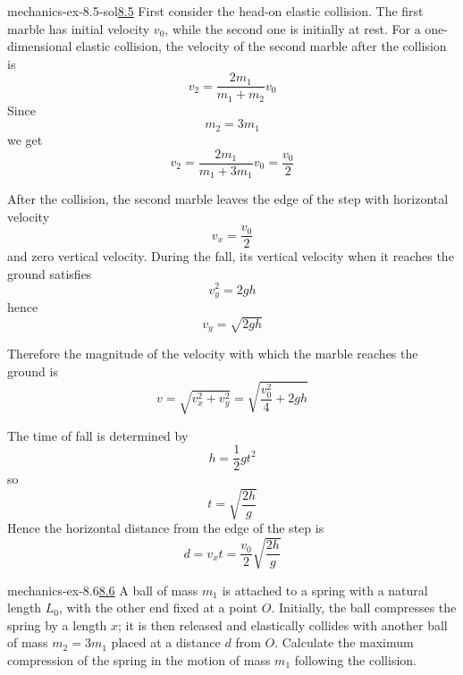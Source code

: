 \documentclass[preview]{standalone}
\begin{document}
\begin{snippetsolution}{mechanics-ex-8.5-sol}{\underline{8.5}}
    First consider the head-on elastic collision. The first marble has initial
    velocity \(v_0\), while the second one is initially at rest. For a one-dimensional
    elastic collision, the velocity of the second marble after the collision is
    \[
        v_2
        =
        \frac{2m_1}{m_1+m_2}v_0
    \]
    Since
    \[
        m_2 = 3m_1
    \]
    we get
    \[
        v_2
        =
        \frac{2m_1}{m_1+3m_1}v_0
        =
        \frac{v_0}{2}
    \]

    After the collision, the second marble leaves the edge of the step with
    horizontal velocity
    \[
        v_x = \frac{v_0}{2}
    \]
    and zero vertical velocity. During the fall, its vertical velocity when it
    reaches the ground satisfies
    \[
        v_y^2 = 2gh
    \]
    hence
    \[
        v_y = \sqrt{2gh}
    \]

    Therefore the magnitude of the velocity with which the marble reaches the
    ground is
    \[
        v
        =
        \sqrt{v_x^2+v_y^2}
        =
        \sqrt{\frac{v_0^2}{4}+2gh}
    \]

    The time of fall is determined by
    \[
        h = \frac{1}{2}gt^2
    \]
    so
    \[
        t = \sqrt{\frac{2h}{g}}
    \]
    Hence the horizontal distance from the edge of the step is
    \[
        d
        =
        v_x t
        =
        \frac{v_0}{2}\sqrt{\frac{2h}{g}}
    \]
\end{snippetsolution}

\begin{snippetexercise}{mechanics-ex-8.6}{\underline{8.6}}
    A ball of mass \(m_1\) is attached to a spring with a natural length \(L_0\),
    with the other end fixed at a point \(O\).
    Initially, the ball compresses the spring by a length \(x\); it is then released and elastically
    collides with another ball of mass \(m_2 = 3m_1\) placed at a distance \(d\) from \(O\).
    Calculate the maximum compression of the spring in the motion of mass \(m_1\) following the collision.
\end{snippetexercise}
\end{document}
